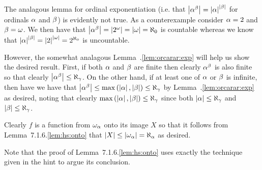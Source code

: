 \begin{solution}
    The analagous lemma for ordinal exponentiation (i.e. that $\left| \alpha^\beta \right| = \left| \alpha \right|^{\left| \beta \right|}$ for ordinals $\alpha$ and $\beta$) is evidently not true.
    As a counterexample consider $\alpha = 2$ and $\beta = \omega$.
    We then have that $\left| \alpha^\beta \right| = \left| 2^\omega \right| = \left| \omega \right| = \aleph_0$ is countable whereas we know that $\left| \alpha \right|^{\left| \beta \right|} = \left| 2 \right|^{\left| \omega \right|} = 2^{\aleph_0}$ is uncountable.

    However, the somewhat analagous Lemma~\ex.\ref{lem:orcarar:exp} will help us show the desired result.
    First, if both $\alpha$ and $\beta$ are finite then clearly $\alpha^\beta$ is also finite so that clearly $\left| \alpha^\beta \right| \leq \aleph_\gamma$.
    On the other hand, if at least one of $\alpha$ or $\beta$ is infinite, then have we have that $\left| \alpha^\beta \right| \leq \max\left( \left| \alpha \right|, \left| \beta \right| \right) \leq \aleph_\gamma$ by Lemma~\ex.\ref{lem:orcarar:exp} as desired, noting that clearly $\max\left( \left| \alpha \right|, \left| \beta \right| \right) \leq \aleph_\gamma$ since both $\left| \alpha \right| \leq \aleph_\gamma$ and $\left| \beta \right| \leq \aleph_\gamma$. \qedsymbol
\end{solution}

\begin{solution}
	Clearly $f$ is a function from $\omega_\alpha$ onto its image $X$ so that it follows from Lemma~7.1.6.\ref{lem:hs:onto} that $\left| X \right| \leq \left| \omega_\alpha \right| = \aleph_\alpha$ as desired. \qedsymbol
    
    Note that the proof of Lemma~7.1.6.\ref{lem:hs:onto} uses exactly the technique given in the hint to argue its conclusion.
\end{solution}
